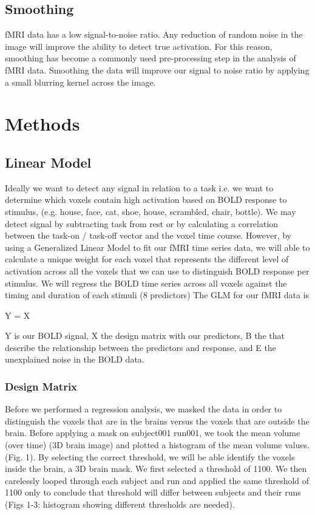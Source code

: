 \documentclass[12pt]{article}
\begin{document}
\subsection{Smoothing}

fMRI data has a low signal-to-noise ratio. Any reduction of random noise in the 
image will improve the ability to detect true activation.  For this reason, 
smoothing has become a commonly used pre-processing step in the analysis of fMRI 
data. Smoothing the data will improve our signal to noise ratio by applying a 
small blurring kernel across the image.

\section{Methods}

\subsection{Linear Model}
Ideally we want to detect any signal in relation to a task i.e. we want to 
determine which voxels contain high activation based on BOLD response to 
stimulus, (e.g. house, face, cat, shoe, house, scrambled, chair, bottle). We 
may detect signal by subtracting task from rest or by calculating a correlation 
between the task-on / task-off vector and the voxel time course. However, by 
using a Generalized Linear Model to fit our fMRI time series data, we will able 
to calculate a unique weight for each voxel that represents the different level 
of activation across all the voxels that we can use to distinguish BOLD 
response per stimulus.  We will regress the BOLD time series across all voxels 
against the timing and duration of each stimuli (8 predictors) The GLM for our 
fMRI data is

Y = X\beta \pm \varepsilon 

Y is our BOLD signal, X the design matrix with our predictors, B the that 
describe the relationship between the predictors and response, and E the 
unexplained noise in the BOLD data.

\subsubsection{Design Matrix}
Before we performed a regression analysis, we masked the data in order to 
distinguish the voxels that are in the brains versus the voxels that are 
outside the brain. Before applying a mask on subject001 run001, we took 
the mean volume (over time) (3D brain image) and plotted a histogram of the 
mean volume values. (Fig. 1). By selecting the correct threshold, we will be 
able identify the voxels inside the brain, a 3D brain mask. We first selected a 
threshold of 1100. We then carelessly looped through each subject and run and 
applied the same threshold of 1100 only to conclude that threshold will differ 
between subjects and their runs (Figs 1-3: histogram showing different 
thresholds are needed). 
\end{document}
